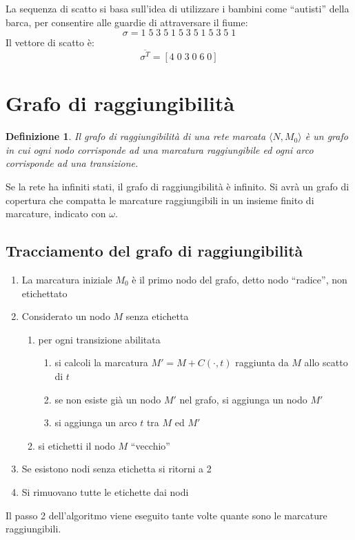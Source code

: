 \documentclass[a4paper]{report}
\newtheorem{definizione}{Definizione}
\begin{document}
La sequenza di scatto si basa sull'idea di utilizzare i bambini come
``autisti'' della barca, per consentire alle guardie di attraversare
il fiume:
\[
\sigma = 1 \; 5\; 3\; 5\; 1 \; 5\; 3\; 5\; 1 \; 5\; 3\; 5\; 1
\]
Il vettore di scatto \`e:
\[
\overline{\sigma^T} = [4\; 0\; 3\; 0\; 6\; 0]
\]

\section{Grafo di raggiungibilit\`a}
\begin{definizione}
  Il grafo di raggiungibilit\`a di una rete marcata $\langle N, M_0
  \rangle$ \`e un grafo in cui ogni nodo corrisponde ad una marcatura
  raggiungibile ed ogni arco corrisponde ad una transizione.
\end{definizione}

Se la rete ha infiniti stati, il grafo di raggiungibilit\`a \`e
infinito. Si avr\`a un grafo di copertura che compatta le marcature
raggiungibili in un insieme finito di marcature, indicato con
$\omega$.
\subsection{Tracciamento del grafo di raggiungibilit\`a}
\begin{enumerate}
\item La marcatura iniziale $M_0$ \`e il primo nodo del grafo, detto
  nodo ``radice'', non etichettato
\item Considerato un nodo $M$ senza etichetta
  \begin{enumerate}
  \item per ogni transizione abilitata
      \begin{enumerate}
      \item si calcoli la marcatura $M' = M + C(\cdot,t)$ raggiunta da
        $M$ allo scatto di $t$
      \item se non esiste gi\`a un nodo $M'$ nel grafo, si aggiunga un
        nodo $M'$
      \item si aggiunga un arco $t$ tra $M$ ed $M'$
      \end{enumerate}
    \item si etichetti il nodo $M$ ``vecchio''
  \end{enumerate}
\item Se esistono nodi senza etichetta si ritorni a 2
\item Si rimuovano tutte le etichette dai nodi
\end{enumerate}
Il passo 2 dell'algoritmo viene eseguito tante volte quante sono le
marcature raggiungibili. 
\end{document}
